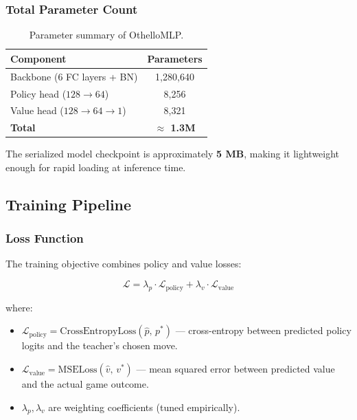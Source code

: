 \subsubsection{Total Parameter Count}

\begin{table}[H]
    \centering
    \caption{Parameter summary of OthelloMLP.}
    \begin{tabular}{lc}
        \toprule
        \textbf{Component} & \textbf{Parameters} \\
        \midrule
        Backbone (6 FC layers + BN) & 1{,}280{,}640 \\
        Policy head ($128 \rightarrow 64$) & 8{,}256 \\
        Value head ($128 \rightarrow 64 \rightarrow 1$) & 8{,}321 \\
        \midrule
        \textbf{Total} & \textbf{$\approx$ 1.3M} \\
        \bottomrule
    \end{tabular}
\end{table}

The serialized model checkpoint is approximately \textbf{5 MB}, making it lightweight enough for rapid loading at inference time.

\subsection{Training Pipeline}

\subsubsection{Loss Function}

The training objective combines policy and value losses:

\begin{equation}
    \mathcal{L} = \lambda_p \cdot \mathcal{L}_{\text{policy}} + \lambda_v \cdot \mathcal{L}_{\text{value}}
\end{equation}

where:
\begin{itemize}
    \item $\mathcal{L}_{\text{policy}} = \text{CrossEntropyLoss}(\hat{p},\, p^*)$ — cross-entropy between predicted policy logits and the teacher's chosen move.
    \item $\mathcal{L}_{\text{value}} = \text{MSELoss}(\hat{v},\, v^*)$ — mean squared error between predicted value and the actual game outcome.
    \item $\lambda_p, \lambda_v$ are weighting coefficients (tuned empirically).
\end{itemize}


